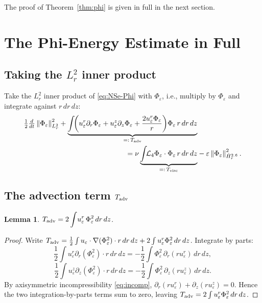 \documentclass{article}
\newtheorem{lemma}[theorem]{Lemma}
\theoremstyle{definition}
\theoremstyle{remark}
\newcommand{\e}{\varepsilon}
\newcommand{\half}{\tfrac{1}{2}}
\newcommand{\Lc}{\mathcal{L}}
\newcommand{\norm}[1]{\left\|#1\right\|}
\newcommand{\ddt}{\tfrac{d}{dt}}
\begin{document}
The proof of Theorem~\ref{thm:phi} is given in full in the next section.

\section{The Phi-Energy Estimate in Full}\label{sec:phienergy}

\subsection{Taking the \texorpdfstring{$L^2_r$}{L2r} inner product}

Take the $L^2_r$ inner product of \eqref{eq:NSe-Phi} with $\Phi_\e$,
i.e., multiply by $\Phi_\e$ and integrate against $r\,dr\,dz$:
\begin{align}
  \half\ddt\norm{\Phi_\e}_{L^2_r}^2
  + \underbrace{\int\!\!\left(u_\e^r\partial_r\Phi_\e
    + u_\e^z\partial_z\Phi_\e
    + \frac{2u_\e^r\Phi_\e}{r}\right)\!\Phi_\e\,r\,dr\,dz}_{=:\,T_{\rm adv}}
  &\nonumber\\
  = \nu\underbrace{\int\!\!\Lc_4\Phi_\e\cdot\Phi_\e\,r\,dr\,dz}_{=:\,T_{\rm visc}}
  &- \e\norm{\Phi_\e}_{\dot H^{2.6}_r}^2.
  \label{eq:Phienergy}
\end{align}

\subsection{The advection term \texorpdfstring{$T_{\rm adv}$}{T-adv}}

\begin{lemma}\label{lem:Tadv}
  $T_{\rm adv} = 2\displaystyle\int\! u_\e^r\,\Phi_\e^2\,dr\,dz$.
\end{lemma}
\begin{proof}
  Write $T_{\rm adv} = \frac{1}{2}\int u_\e\cdot\nabla(\Phi_\e^2)
  \cdot r\,dr\,dz + 2\int u_\e^r\Phi_\e^2\,dr\,dz$.
  Integrate by parts:
  \[
    \frac{1}{2}\int u_\e^r\partial_r(\Phi_\e^2)\cdot r\,dr\,dz
    = -\frac{1}{2}\int\Phi_\e^2\,\partial_r(r u_\e^r)\,dr\,dz,
  \]
  \[
    \frac{1}{2}\int u_\e^z\partial_z(\Phi_\e^2)\cdot r\,dr\,dz
    = -\frac{1}{2}\int\Phi_\e^2\,\partial_z(r u_\e^z)\,dr\,dz.
  \]
  By axisymmetric incompressibility \eqref{eq:incomp},
  $\partial_r(r u_\e^r) + \partial_z(r u_\e^z) = 0$.  Hence the two
  integration-by-parts terms sum to zero, leaving
  $T_{\rm adv} = 2\int u_\e^r\Phi_\e^2\,dr\,dz$.
\end{proof}
\end{document}
